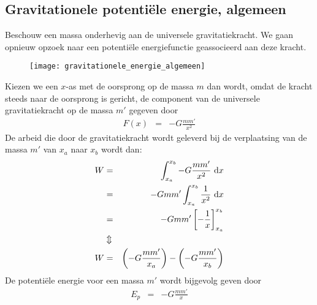 \documentclass{ximera}
\begin{document}
	\author{Bart Lambregs}


	\subsection{Gravitationele potenti\"ele energie, algemeen}\label{gravitationele potentiele energie alg}

	Beschouw een massa onderhevig aan de universele gravitatiekracht. We gaan opnieuw opzoek naar een potenti\"ele energiefunctie geassocieerd aan deze kracht.
	\begin{figure}[h]
	\begin{center}
	\texttt{[image: gravitationele\_energie\_algemeen]}
	\end{center}
	\end{figure}
	
	Kiezen we een $x$-as met de oorsprong op de massa $m$ dan wordt, omdat de kracht steeds naar de oorsprong is gericht, de component van de universele gravitatiekracht op de massa $m'$ gegeven door
	\begin{eqnarray*}
	F(x)&=&-G\frac{mm'}{x^2}
	\end{eqnarray*}
	De arbeid die door de gravitatiekracht wordt geleverd bij de verplaatsing van de massa $m'$ van $x_a$ naar $x_b$ wordt dan:
	\begin{eqnarray*}
	W&=&\int_{x_a}^{x_b}-G\frac{mm'}{x^2}~{\rm d}x\\
	&=&-Gmm'\int_{x_a}^{x_b}\frac{1}{x^2}~{\rm d}x\\
	&=&-Gmm'\left[-\frac{1}{x}\right]_{x_a}^{x_b}\\
	&\Updownarrow&\\
	W&=&\left(-G\frac{mm'}{x_a}\right)-\left(-G\frac{mm'}{x_b}\right)
	\end{eqnarray*}
	De potenti\"ele energie voor een massa $m'$ wordt bijgevolg geven
	door
	\begin{eqnarray}
	E_p&=&-G\frac{mm'}{x}\label{Ep=-Gmm'/x}
	\end{eqnarray}
	
\end{document}
